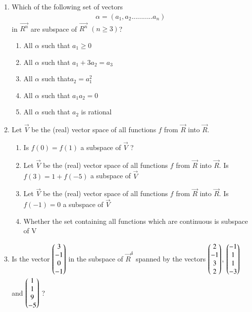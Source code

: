 \renewcommand{\theequation}{\theenumi}
\renewcommand{\thefigure}{\theenumi}
\begin{enumerate}[label=\thesubsection.\arabic*.,ref=\thesubsection.\theenumi]
%
\item Which of the following set of vectors
\begin{align}\alpha=(a_1,a_2...........a_n)\nonumber\end{align} in $\vec{R^n}$ are subspace of $\vec{R^n}$ $(n\geq3)$?\\
\begin{enumerate}
\item All $\alpha$ such that $a_1\geq0$\\
\item All $\alpha$ such that $a_1+3a_2=a_3$\\
\item All $\alpha$ such that$a_2=a_1^{2}$\\
\item All $\alpha$ such that $a_1a_2=0$\\
\item All $\alpha$ such that $a_2$ is rational
\end{enumerate}
%
\solution

\item Let $\vec{V}$ be the (real) vector space of all functions $f$
from $\vec{R}$ into $\vec{R}$. 
%
\begin{enumerate}
\item Is $f(0) = f(1)$ a
subspace of $\vec{V}$ ?
\\
\solution

\item Let $\vec{V}$ be the (real) vector space of all functions $f$
from $\vec{R}$ into $\vec{R}$. Is $f(3)=1+f(-5)$ a
subspace of $\vec{V}$ 
%
\\
\solution

%
\item Let $\vec{V}$ be the (real) vector space of all functions $f$
from $\vec{R}$ into $\vec{R}$. Is $f(-1) = 0 $ a
subspace of $\vec{V}$ 
%
\\
\solution

\item Whether the set containing all functions which are continuous is subspace of V
\\
\solution

\end{enumerate}
\item Is the vector $\begin{pmatrix}3\\-1\\0\\-1\end{pmatrix}$ in the subspace of $\vec{R}^{4}$ spanned by the vectors $\begin{pmatrix}2\\-1\\3\\2\end{pmatrix}$, $\begin{pmatrix}-1\\1\\1\\-3\end{pmatrix}$ and $\begin{pmatrix}1\\1\\9\\-5\end{pmatrix}$ ?

\end{enumerate}
